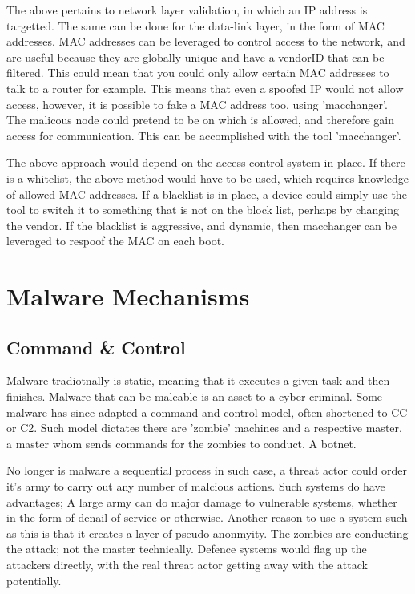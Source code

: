 The above pertains to network layer validation, in which an IP address is targetted. The same can be done for the data-link layer, in the form of MAC addresses. MAC addresses can be leveraged to control access to the network, and are useful because they are globally unique and have a vendorID that can be filtered.
This could mean that you could only allow certain MAC addresses to talk to a router for example. This means that even a spoofed IP would not allow access, however, it is possible to fake a MAC address too, using 'macchanger'. The malicous node could pretend to be on which is allowed, and therefore gain access for communication. 
This can be accomplished with the tool 'macchanger'. \citep{IPMACSpoofing}

The above approach would depend on the access control system in place. If there is a whitelist, the above method would have to be used, which requires knowledge of allowed MAC addresses. If a blacklist is in place, a device could simply use the tool to switch it to something that is not on the block list, perhaps by changing the vendor. If the blacklist is aggressive, and dynamic, then macchanger can be leveraged to respoof the MAC on each boot.



\chapter{Malware Mechanisms}

\section{Command \& Control}
Malware tradiotnally is static, meaning that it executes a given task and then finishes. Malware that can be maleable is an asset to a cyber criminal. 
Some malware has since adapted a command and control model, often shortened to CC or C2. Such model dictates there are 'zombie' machines and a respective master, a master whom sends commands for the zombies to conduct. A botnet.

No longer is malware a sequential process in such case, a threat actor could order it's army to carry out any number of malcious actions. Such systems do have advantages; A large army can do major damage to vulnerable systems, whether in the form of denail of service or otherwise.
Another reason to use a system such as this is that it creates a layer of pseudo anonmyity. The zombies are conducting the attack; not the master technically. Defence systems would flag up the attackers directly, with the real threat actor getting away with the attack potentially.

